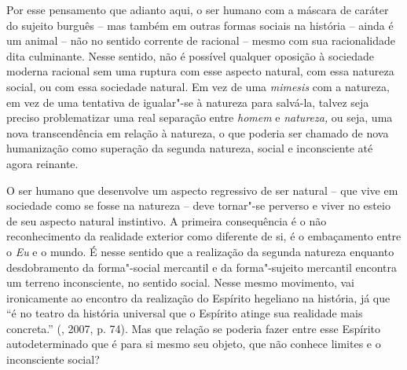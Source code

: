 Por esse pensamento que adianto aqui, o ser humano com a máscara de
caráter do sujeito burguês -- mas também em outras formas sociais na
história -- ainda é um animal -- não no sentido corrente de racional --
mesmo com sua racionalidade dita culminante. Nesse sentido, não é
possível qualquer oposição à sociedade moderna racional sem uma ruptura
com esse aspecto natural, com essa natureza social, ou com essa
sociedade natural. Em vez de uma \emph{mimesis} com a natureza, em vez
de uma tentativa de igualar"-se à natureza para salvá-la, talvez seja
preciso problematizar uma real separação entre \emph{homem} e
\emph{natureza,} ou seja, uma nova transcendência em relação à natureza,
o que poderia ser chamado de nova humanização como superação da segunda
natureza, social e inconsciente até agora reinante.

O ser humano que desenvolve um aspecto regressivo de ser natural -- que
vive em sociedade como se fosse na natureza -- deve tornar"-se perverso e
viver no esteio de seu aspecto natural instintivo. A primeira
consequência é o não reconhecimento da realidade exterior como diferente
de si, é o embaçamento entre o \emph{Eu} e o mundo. É nesse sentido que
a realização da segunda natureza enquanto desdobramento da forma"-social
mercantil e da forma"-sujeito mercantil encontra um terreno inconsciente,
no sentido social. Nesse mesmo movimento, vai ironicamente ao encontro
da realização do Espírito hegeliano na história, já que ``é no teatro da
história universal que o Espírito atinge sua realidade mais concreta.''
(, 2007, p. 74). Mas que relação se poderia fazer entre esse
Espírito autodeterminado que é para si mesmo seu objeto, que não conhece
limites e o inconsciente social?

